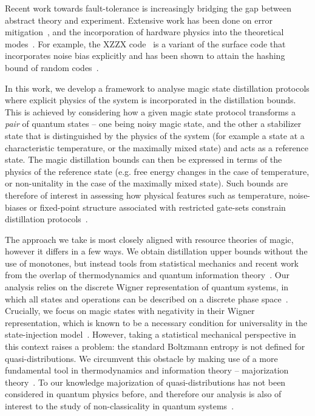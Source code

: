 \documentclass[pra,
aps,
twocolumn,
superscriptaddress,
groupedaddress,
nofootinbib,
reprint
]{revtex4-1}
\begin{document}
Recent work towards fault-tolerance is increasingly bridging the gap between abstract theory and experiment. Extensive work has been done on error mitigation~\cite{Li_2017, Temme_2017, Endo_2018, McClean_2017}, and the incorporation of hardware physics into the theoretical modes~\cite{holmes_resource_2019, Kandala_2019, Colless_2018, song2018quantum, Bravyi_2021}. For example, the XZZX code~\cite{bonilla_ataides_xzzx_2021} is a variant of the surface code that incorporates noise bias explicitly and has been shown to attain the hashing bound of random codes~\cite{Bennett_1996}. 

In this work, we develop a framework to analyse magic state distillation protocols where explicit physics of the system is incorporated in the distillation bounds. This is achieved by considering how a given magic state protocol transforms a \emph{pair} of quantum states -- one being noisy magic state, and the other a stabilizer state that is distinguished by the physics of the system (for example a state at a characteristic temperature, or the maximally mixed state) and acts as a reference state. The magic distillation bounds can then be expressed in terms of the physics of the reference state (e.g. free energy changes in the case of temperature, or non-unitality in the case of the maximally mixed state). Such bounds are therefore of interest in assessing how physical features such as temperature, noise-biases or fixed-point structure associated with restricted gate-sets constrain distillation protocols~\cite{Aliferis_2008, Stephens_2013, Li_2015, Babbush_2018, Tuckett_2019, Guillaud_2019, Fowler_2019}. 

The approach we take is most closely aligned with resource theories of magic, however it differs in a few ways. We obtain distillation upper bounds without the use of monotones, but instead tools from statistical mechanics and recent work from the overlap of thermodynamics and quantum information theory~\cite{cit:janzing, cit:horodecki2, Brandao_2015, Vinjanampathy_2016, Goold_2016, cit:lostaglio, cit:gour}. Our analysis relies on the discrete Wigner representation of quantum systems, in which all states and operations can be described on a discrete phase space~\cite{Ferrie_2008, Okay_2021}. Crucially, we focus on magic states with negativity in their Wigner representation, which is known to be a necessary condition for universality in the state-injection model~\cite{cit:veitch, cit:mari, cit:gottesman, cit:knill, Campbell_2011}. However, taking a statistical mechanical perspective in this context raises a problem: the standard Boltzmann entropy is not defined for quasi-distributions. We circumvent this obstacle by making use of a more fundamental tool in thermodynamics and information theory -- majorization theory~\cite{cit:marshall, Veinott_1971, Ruch_1976}. To our knowledge majorization of quasi-distributions has not been considered in quantum physics before, and therefore our analysis is also of interest to the study of non-classicality in quantum systems~\cite{Allahverdyan_2018, arvidsson_2020, halpern_2018, Lostaglio_2018, Levy_2020}.
\end{document}
